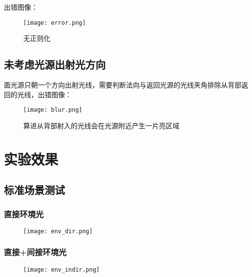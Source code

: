 \documentclass[14pt]{scrartcl} %
\begin{document}
出错图像：
\begin{figure}[h] %
	\centering
	\texttt{[image: error.png]} %
	\caption{无正则化}
\end{figure}

\subsection{未考虑光源出射光方向}

面光源只朝一个方向出射光线，需要判断法向与返回光源的光线夹角排除从背部返回的光线，出错图像：

\begin{figure}[h] %
	\centering
	\texttt{[image: blur.png]} %
	\caption{算进从背部射入的光线会在光源附近产生一片亮区域}
\end{figure}

\pagebreak

\section{实验效果}

\subsection{标准场景测试}

\subsubsection{直接环境光}

\begin{figure}[h] %
	\centering
	\texttt{[image: env\_dir.png]} %
\end{figure}

\subsubsection{直接+间接环境光}

\begin{figure}[h] %
	\centering
	\texttt{[image: env\_indir.png]} %
\end{figure}
\end{document}
